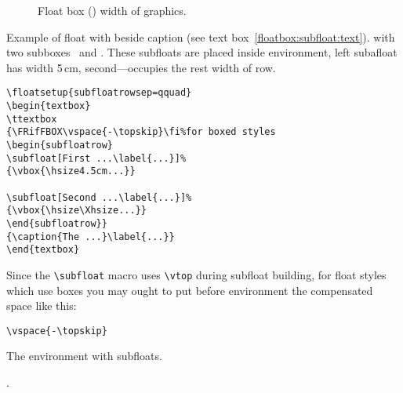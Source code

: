 \begin{figure}
  {\caption{%
Float box (\protect{})
width of graphics.  \text }\label{floatbox:FB:fig}}
\end{figure}

\Text

\ifLoadSubfig

\clearpage
Example of float with beside caption (see text box~\ref{floatbox:subfloat:text}).
with two subboxes~ and .
These subfloats are placed inside  environment, left subafloat has width 5\,cm,
second---occupies the rest width of row.
\begin{verbatim}
\floatsetup{subfloatrowsep=qquad}
\begin{textbox}
\ttextbox
{\FRifFBOX\vspace{-\topskip}\fi%for boxed styles
\begin{subfloatrow}
\subfloat[First ...\label{...}]%
{\vbox{\hsize4.5cm...}}

\subfloat[Second ...\label{...}]%
{\vbox{\hsize\Xhsize...}}
\end{subfloatrow}}
{\caption{The ...}\label{...}}
\end{textbox}
\end{verbatim}

Since the \verb|\subfloat| macro uses \verb|\vtop| during subfloat building, for
float styles which use boxes you may ought to put before 
environment the compensated space like this:
\begin{verbatim}
\vspace{-\topskip}
\end{verbatim}

\begin{textbox}[!t]
\ttextbox
{\FRifFBOX\vspace{-\topskip}\fi%
\begin{subfloatrow}

%
\end{subfloatrow}}
{\caption{The  environment with subfloats. \text}%
\label{floatbox:subfloat:text}}
\end{textbox}

\text.

